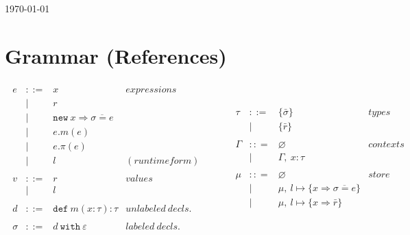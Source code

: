\documentclass{llncs}
\newcommand{\keywadj}[1]{\mathtt{#1}}
\newcommand{\keyw}[1]{\keywadj{#1}~}
\begin{document}
\today

\section{Grammar (References)}

\[
\begin{array}{lll}
\begin{array}{lllr}
	e & ::= & x & expressions \\
  		& | & r \\
  		& | & \keywadj{new}~x \Rightarrow \overline{\sigma = e} \\
  		& | & e.m(e)\\
  		& | & e.\pi(e)\\
		& | & l & (runtime form) \\
		&&\\
		
	v & ::= & r & values \\
		& | & l \\
		&&\\

	d & ::= & \keyw{def} m(x:\tau):\tau & unlabeled~decls.\\		&&\\
		
	\sigma & ::= & d~\keyw{with}\varepsilon  & labeled~ decls.\\
		&&\\
\end{array}
& ~~~~~~
&

\begin{array}{lllr}

	\tau & ::= & \{ \bar \sigma \}  & types \\
		& | & \{ \bar r \} \\
		&&\\

	\Gamma & :: = & \varnothing & contexts\\
		& | & \Gamma,~x : \tau\\
		&&\\

	\mu & :: = & \varnothing & store\\
		& | & \mu,~l \mapsto \{ x \Rightarrow \overline{\sigma = e}\} \\
		& | & \mu,~l \mapsto \{ x \Rightarrow \bar r \} \\
&&\\

\end{array}
\end{array}
\]
\end{document}
